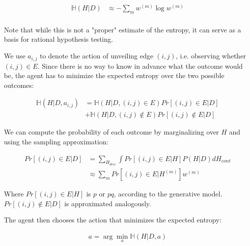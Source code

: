 \documentclass[11pt]{article}
\begin{document}
\begin{align} 
    \mathbb{H}(H|D) &\approx - \sum_m w^{(m)} \log w^{(m)} \\
\end{align}

Note that while this is not a "proper" estimate of the entropy, it can serve as a basis for rational hypothesis testing.

We use $a_{i,j}$ to denote the action of unveiling edge $(i,j)$, i.e. observing whether $(i,j) \in E$. Since there is no way to know in advance what the outcome would be, the agent has to minimize the expected entropy over the two possible outcomes:

\begin{align}
    \mathbb{H}(H|D,a_{i,j}) &= \mathbb{H}(H|D, (i,j) \in E) Pr[(i,j) \in E | D]  \\
                            &+ \mathbb{H}(H|D, (i,j) \notin E) Pr[(i,j) \notin E | D]
\end{align}

We can compute the probability of each outcome by marginalizing over $H$ and using the sampling approximation:

\begin{align}
    Pr[(i,j) \in E | D] &=  \sum_{H_{disc}} \int Pr[(i,j) \in E | H] P(H|D)  dH_{cont} \\
                       &\approx \sum_m  Pr[(i,j) \in E | H^{(m)}] w^{(m)} 
\end{align}

Where $Pr[(i,j) \in E | H]$ is $p$ or $pq$, according to the generative model. $Pr[(i,j) \notin E | D]$ is approximated analogously.

The agent then chooses the action that minimizes the expected entropy:

\begin{align}
    a = \arg \min_a \mathbb{H}(H|D,a)
\end{align}
\end{document}
